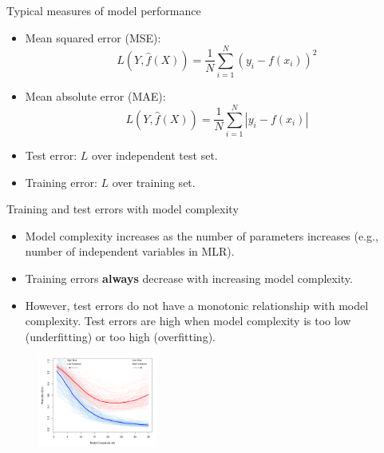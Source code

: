 \documentclass[aspectratio=169]{beamer}
\begin{document}
\begin{frame}{Typical measures of model performance}
    \begin{itemize}
        \item Mean squared error (MSE):
            \begin{equation*}
                L(Y, \hat{f}(X)) = \frac{1}{N}\sum_{i=1}^N (y_i - f(x_i))^2
            \end{equation*}
        \item Mean absolute error (MAE):
            \begin{equation*}
                L(Y, \hat{f}(X)) = \frac{1}{N}\sum_{i=1}^N \left| y_i - f(x_i) \right|
            \end{equation*}
        \item Test error: $L$ over independent test set.
        \item Training error: $L$ over training set.
    \end{itemize}
\end{frame}


\begin{frame}{Training and test errors with model complexity}
    \begin{itemize}
        \item Model complexity increases as the number of parameters increases (e.g., number of independent variables in MLR). 
        \item Training errors \textbf{always} decrease with increasing model complexity.
        \item However, test errors do not have a monotonic relationship with model complexity. Test errors are high when model complexity is too low (underfitting) or too high (overfitting).
    \end{itemize}
    \begin{figure}
        \centering
        \includegraphics[width=0.35\textwidth]{figures/fig7-1.pdf}
    \end{figure}
\end{frame}
\end{document}

